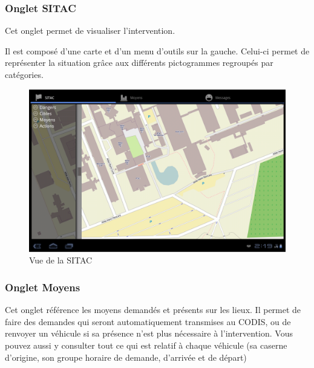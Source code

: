 \documentclass{article}
\begin{document}
\subsubsection{Onglet SITAC}

Cet onglet permet de visualiser l’intervention.

Il est composé d’une carte et d’un menu d’outils sur la gauche. Celui-ci permet de représenter la situation grâce aux différents pictogrammes regroupés par catégories.

\begin{figure}[htb]
\begin{center}
\includegraphics[width=487pt]{Manueldutilisation-fig001.png}
\caption{Vue de la SITAC}
\end{center}
\end{figure}

\subsubsection{Onglet Moyens}

Cet onglet référence les moyens demandés et présents sur les lieux. Il permet de faire des demandes qui seront automatiquement transmises au CODIS, ou de renvoyer un véhicule si sa présence n’est plus nécessaire à l’intervention. Vous pouvez aussi y consulter tout ce qui est relatif à chaque véhicule (sa caserne d’origine, son groupe horaire de demande, d’arrivée et de départ)
\end{document}
